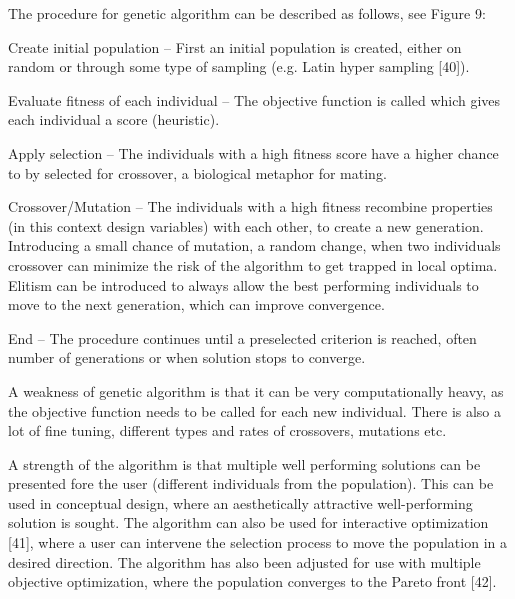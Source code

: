 The procedure for genetic algorithm can be described as follows, see Figure 9:



\item Create initial population – First an initial population is created, either on random or through some type of sampling (e.g. Latin hyper sampling [40]).

\item Evaluate fitness of each individual – The objective function is called which gives each individual a score (heuristic).

\item Apply selection – The individuals with a high fitness score have a higher chance to by selected for crossover, a biological metaphor for mating.

\item Crossover/Mutation – The individuals with a high fitness recombine properties (in this context design variables) with each other, to create a new generation. Introducing a small chance of mutation, a random change, when two individuals crossover can minimize the risk of the algorithm to get trapped in local optima. Elitism can be introduced to always allow the best performing individuals to move to the next generation, which can improve convergence. 

\item End – The procedure continues until a preselected criterion is reached, often number of generations or when solution stops to converge.



A weakness of genetic algorithm is that it can be very computationally heavy, as the objective function needs to be called for each new individual. There is also a lot of fine tuning, different types and rates of crossovers, mutations etc. 



A strength of the algorithm is that multiple well performing solutions can be presented fore the user (different individuals from the population). This can be used in conceptual design, where an aesthetically attractive well-performing solution is sought. The algorithm can also be used for interactive optimization [41], where a user can intervene the selection process to move the population in a desired direction. The algorithm has also been adjusted for use with multiple objective optimization, where the population converges to the Pareto front [42].



